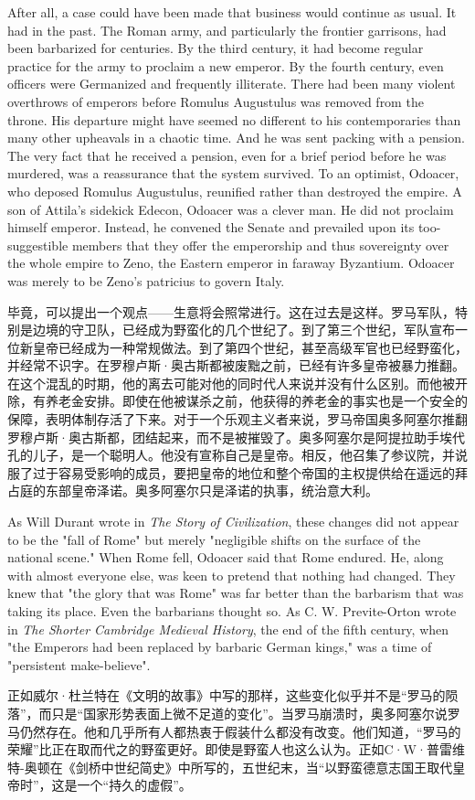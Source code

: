 \begin{paracol}{2}
\switchcolumn*
After all, a case could have been made that business would continue as usual. It had in the past. The Roman army, and particularly the frontier garrisons, had been barbarized for centuries. By the third century, it had become regular practice for the army to proclaim a new emperor. By the fourth century, even officers were Germanized and frequently illiterate. There had been many violent overthrows of emperors before Romulus Augustulus was removed from the throne. His departure might have seemed no different to his contemporaries than many other upheavals in a chaotic time. And he was sent packing with a pension. The very fact that he received a pension, even for a brief period before he was murdered, was a reassurance that the system survived. To an optimist, Odoacer, who deposed Romulus Augustulus, reunified rather than destroyed the empire. A son of Attila's sidekick Edecon, Odoacer was a clever man. He did not proclaim himself emperor. Instead, he convened the Senate and prevailed upon its too-suggestible members that they offer the emperorship and thus sovereignty over the whole empire to Zeno, the Eastern emperor in faraway Byzantium. Odoacer was merely to be Zeno's patricius to govern Italy.  

\switchcolumn
毕竟，可以提出一个观点——生意将会照常进行。这在过去是这样。罗马军队，特别是边境的守卫队，已经成为野蛮化的几个世纪了。到了第三个世纪，军队宣布一位新皇帝已经成为一种常规做法。到了第四个世纪，甚至高级军官也已经野蛮化，并经常不识字。在罗穆卢斯·奥古斯都被废黜之前，已经有许多皇帝被暴力推翻。在这个混乱的时期，他的离去可能对他的同时代人来说并没有什么区别。而他被开除，有养老金安排。即使在他被谋杀之前，他获得的养老金的事实也是一个安全的保障，表明体制存活了下来。对于一个乐观主义者来说，罗马帝国奥多阿塞尔推翻罗穆卢斯·奥古斯都，团结起来，而不是被摧毁了。奥多阿塞尔是阿提拉助手埃代孔的儿子，是一个聪明人。他没有宣称自己是皇帝。相反，他召集了参议院，并说服了过于容易受影响的成员，要把皇帝的地位和整个帝国的主权提供给在遥远的拜占庭的东部皇帝泽诺。奥多阿塞尔只是泽诺的执事，统治意大利。

\switchcolumn*
As Will Durant wrote in \emph{The Story of Civilization}, these changes did not appear to be the "fall of Rome" but merely "negligible shifts on the surface of the national scene." When Rome fell, Odoacer said that Rome endured. He, along with almost everyone else, was keen to pretend that nothing had changed. They knew that "the glory that was Rome" was far better than the barbarism that was taking its place. Even the barbarians thought so. As C. W. Previte-Orton wrote in \emph{The Shorter Cambridge Medieval History}, the end of the fifth century, when "the Emperors had been replaced by barbaric German kings," was a time of "persistent make-believe".  

\switchcolumn
正如威尔·杜兰特在《文明的故事》中写的那样，这些变化似乎并不是“罗马的陨落”，而只是“国家形势表面上微不足道的变化”。当罗马崩溃时，奥多阿塞尔说罗马仍然存在。他和几乎所有人都热衷于假装什么都没有改变。他们知道，“罗马的荣耀”比正在取而代之的野蛮更好。即使是野蛮人也这么认为。正如C·W·普雷维特-奥顿在《剑桥中世纪简史》中所写的，五世纪末，当“以野蛮德意志国王取代皇帝时”，这是一个“持久的虚假”。

\end{paracol}

